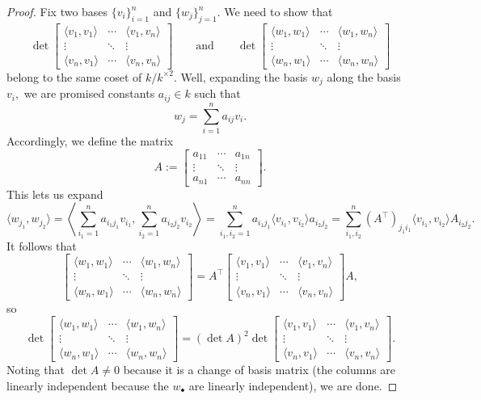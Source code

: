 \begin{proof}
	Fix two bases $\{v_i\}_{i=1}^n$ and $\{w_j\}_{j=1}^n.$ We need to show that
	\[\det\begin{bmatrix}
		\langle v_1,v_1\rangle & \cdots & \langle v_1,v_n\rangle \\
		\vdots & \ddots & \vdots \\
		\langle v_n,v_1\rangle & \cdots & \langle v_n,v_n\rangle
	\end{bmatrix}\qquad\text{and}\qquad\det\begin{bmatrix}
		\langle w_1,w_1\rangle & \cdots & \langle w_1,w_n\rangle \\
		\vdots & \ddots & \vdots \\
		\langle w_n,w_1\rangle & \cdots & \langle w_n,w_n\rangle
	\end{bmatrix}\]
	belong to the same coset of $k/k^{\times2}.$ Well, expanding the basis $w_j$ along the basis $v_i,$ we are promised constants $a_{ij}\in k$ such that
	\[w_j=\sum_{i=1}^na_{ij}v_i.\]
	Accordingly, we define the matrix
	\[A:=\begin{bmatrix}
		a_{11} & \cdots & a_{1n} \\
		\vdots & \ddots & \vdots \\
		a_{n1} & \cdots & a_{nn}
	\end{bmatrix}.\]
	This lets us expand
	\[\langle w_{j_1},w_{j_2}\rangle=\left\langle\sum_{i_1=1}^na_{i_1j_1}v_{i_1},\sum_{i_2=1}^na_{i_2j_2}v_{i_2}\right\rangle=\sum_{i_1,i_2=1}^na_{i_1j_1}\langle v_{i_1},v_{i_2}\rangle a_{i_2j_2}=\sum_{i_1,i_2}^n(A^\intercal)_{j_1i_1}\langle v_{i_1},v_{i_2}\rangle A_{i_2j_2}.\]
	It follows that
	\[\begin{bmatrix}
		\langle w_1,w_1\rangle & \cdots & \langle w_1,w_n\rangle \\
		\vdots & \ddots & \vdots \\
		\langle w_n,w_1\rangle & \cdots & \langle w_n,w_n\rangle
	\end{bmatrix}=A^\intercal\begin{bmatrix}
		\langle v_1,v_1\rangle & \cdots & \langle v_1,v_n\rangle \\
		\vdots & \ddots & \vdots \\
		\langle v_n,v_1\rangle & \cdots & \langle v_n,v_n\rangle
	\end{bmatrix}A,\]
	so
	\[\det\begin{bmatrix}
		\langle w_1,w_1\rangle & \cdots & \langle w_1,w_n\rangle \\
		\vdots & \ddots & \vdots \\
		\langle w_n,w_1\rangle & \cdots & \langle w_n,w_n\rangle
	\end{bmatrix}=(\det A)^2\det\begin{bmatrix}
		\langle v_1,v_1\rangle & \cdots & \langle v_1,v_n\rangle \\
		\vdots & \ddots & \vdots \\
		\langle v_n,v_1\rangle & \cdots & \langle v_n,v_n\rangle
	\end{bmatrix}.\]
	Noting that $\det A\ne0$ because it is a change of basis matrix (the columns are linearly independent because the $w_\bullet$ are linearly independent), we are done.
\end{proof}
